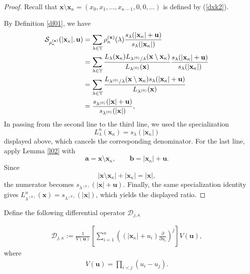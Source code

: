 \documentclass[11pt]{amsart}
\theoremstyle{plain}
\newcommand\YY{{\mathbb {Y}}}
\numberwithin{equation}{section}
\numberwithin{theorem}{section}
\numberwithin{figure}{section}
\begin{document}
\begin{proof}Recall that 
$\mathbf{x}\setminus \mathbf{x}_{\kappa}=(x_0,x_1,\ldots,x_{\kappa-1},0,0,\ldots)$ is defined by (\ref{dxk2}).

By Definition \ref{df01}, we have
\begin{align}
\mathcal{S}_{\rho_{\kappa}^{(\mathbf{x})}}
(|\mathbf{x}_{\kappa}|,\mathbf{u})
&=\sum_{\lambda\in \YY}\rho_{\kappa}^{(\mathbf{x})}(\lambda)\frac{s_{\lambda}(|\mathbf{x}_{\kappa}|+\mathbf{u})}{s_{\lambda}(|\mathbf{x}_{\kappa}|)}\label{srk}\\
&=\sum_{\lambda\in \YY}\frac{L_{\lambda}(\mathbf{x}_{\kappa})L_{\lambda^{(0)}/ \lambda}(\mathbf{x}\setminus \mathbf{x}_{\kappa} )}{L_{\lambda^{(0)}}(\mathbf{x})}\frac{s_{\lambda}(|\mathbf{x}_{\kappa}|+\mathbf{u})}{s_{\lambda}(|\mathbf{x}_{\kappa}|)}\notag\\
&=\sum_{\lambda\in \YY}\frac{L_{\lambda^{(0)}/ \lambda}(\mathbf{x}\setminus \mathbf{x}_{\kappa} )s_{\lambda}(|\mathbf{x}_{\kappa}|+\mathbf{u})}{L_{\lambda^{(0)}}(\mathbf{x})}\notag\\
&=\frac{s_{\lambda^{(0)}}(|\mathbf{x}|+\mathbf{u})}{s_{
\lambda^{(0)}}(|\mathbf{x}|)},\notag
\end{align}
In passing from the second line to the third line, we used the specialization
\[
    L_{\lambda}^n(\mathbf{x}_{\kappa})
    =s_{\lambda}(|\mathbf{x}_{\kappa}|)
\]
displayed above, which cancels the corresponding denominator. For the last
line, apply Lemma \ref{l02} with
\[
    \mathbf{a}=\mathbf{x}\setminus\mathbf{x}_{\kappa},
    \qquad
    \mathbf{b}=|\mathbf{x}_{\kappa}|+\mathbf{u}.
\]
Since
\[
    |\mathbf{x}\setminus\mathbf{x}_{\kappa}|
    +|\mathbf{x}_{\kappa}|=|\mathbf{x}|,
\]
the numerator becomes $s_{\lambda^{(0)}}(|\mathbf{x}|+\mathbf{u})$.
Finally, the same specialization identity gives
$L_{\lambda^{(0)}}^n(\mathbf{x})=s_{\lambda^{(0)}}(|\mathbf{x}|)$,
which yields the displayed ratio.
\end{proof}

Define the following differential operator $\mathcal{D}_{j,\kappa}$ 
 
  \begin{eqnarray*}
\mathcal{D}_{j,\kappa} :=\frac{1}{V(\mathbf{u})}
\left[\sum_{i=1}^{n}\left((|\mathbf{x}_{\kappa}|+u_i)\frac{\partial}{\partial u_i}\right)^j\right]
V(\mathbf{u}),
\end{eqnarray*} 
where
\begin{eqnarray*}
V(\mathbf{u})=\prod_{i<j}(u_i-u_j).
\end{eqnarray*}
\end{document}
